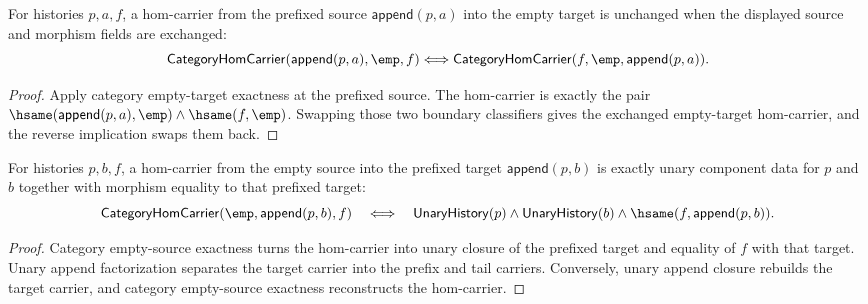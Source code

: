 \begin{theorem}
\label{thm:functor-prefix-hom-carrier-empty-target-source-morphism-swap}
For histories $p,a,f$, a hom-carrier from the prefixed source
$\mathsf{append}(p,a)$ into the empty target is unchanged when the displayed
source and morphism fields are exchanged:
$$
\mathsf{CategoryHomCarrier}(\mathsf{append}(p,a),\emp,f)
\Longleftrightarrow
\mathsf{CategoryHomCarrier}(f,\emp,\mathsf{append}(p,a)).
$$
\end{theorem}
\begin{proof}
Apply category empty-target exactness at the prefixed source. The hom-carrier
is exactly the pair
$\hsame(\mathsf{append}(p,a),\emp)\wedge\hsame(f,\emp)$. Swapping those two
boundary classifiers gives the exchanged empty-target hom-carrier, and the
reverse implication swaps them back.
\end{proof}

\begin{theorem}
\label{thm:functor-prefix-hom-carrier-empty-source-components}
For histories $p,b,f$, a hom-carrier from the empty source into the prefixed
target $\mathsf{append}(p,b)$ is exactly unary component data for $p$ and $b$
together with morphism equality to that prefixed target:
$$
\mathsf{CategoryHomCarrier}(\emp,\mathsf{append}(p,b),f)
\quad\Longleftrightarrow\quad
\mathsf{UnaryHistory}(p)\wedge
\mathsf{UnaryHistory}(b)\wedge
\hsame(f,\mathsf{append}(p,b)).
$$
\end{theorem}
\begin{proof}
Category empty-source exactness turns the hom-carrier into unary closure of the
prefixed target and equality of $f$ with that target. Unary append factorization
separates the target carrier into the prefix and tail carriers. Conversely,
unary append closure rebuilds the target carrier, and category empty-source
exactness reconstructs the hom-carrier.
\end{proof}

